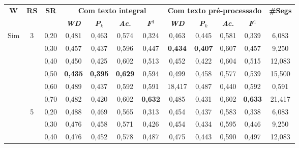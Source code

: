 
\begin{table}[!h]
	\tiny 
	\centering
	\begin{tabular}{|c|c|c||c|c|c|c||c|c|c|c||c|} 
\hline 
\multirow{2}{*}{\textbf{W}} & \multirow{2}{*}{\textbf{RS}} & \multirow{2}{*}{\textbf{SR}} & \multicolumn{4}{c||}{\textbf{Com texto integral}} & \multicolumn{4}{c||}{\textbf{Com texto pré-processado}}& \multirow{2}{*}{\textbf{\#Segs}} \\\cline{4-11}

																									   && & \textit{\textbf{WD}} & \textbf{\textit{P}$_k$} & \textit{\textbf{Ac.}} & \textbf{\textit{F}$^1$} & \textit{\textbf{WD}} & \textbf{\textit{P}$_k$} & \textit{\textbf{Ac.}} & \textbf{\textit{F}$^1$} & \\ \hline 
 \multirow{18}{*}{Sim} & \multirow{6}{*}{3} 
	 & 0,20    & 0,481 & 0,463 & 0,574 & 0,324         &     0,463 &  0,445 & 0,581 & 0,339 & 6,083                \\ \cline{3-12}
	&& 0,30    & 0,457 & 0,437 & 0,596 & 0,447         &     \cellcolor{gray!20} \textbf{0,434} & \cellcolor{gray!20} \textbf{0,407} & 0,607 & 0,457 & 9,250  \\\cline{3-12} 
	&& 0,40    & 0,450 & 0,425 & 0,602 & 0,513         &     0,452 &  0,422 & 0,604 & 0,515 & 12,083              \\ \cline{3-12}                                            
	&& 0,50    & \cellcolor{gray!20} \textbf{0,435} & \cellcolor{gray!20} \textbf{0,395} & \cellcolor{gray!20} \textbf{0,629} & 0,594  &     0,499 &  0,458 & 0,577 & 0,539 & 15,500              \\ \cline{3-12}
	&& 0,60    & 0,489 & 0,437 & 0,592 & 0,591 & 18,417                                &     0,487 &  0,440 & 0,592 & 0,591               \\ \cline{3-12}                 
	&& 0,70    & 0,482 & 0,420 & 0,602 & \cellcolor{gray!20} \textbf{0,632} &    0,485 &  0,431 & 0,602 & \cellcolor{gray!20} \textbf{0,633} & 21,417 \\ \cline{2-12} 
 & \multirow{6}{*}{5} 
	  & 0,20    & 0,488 & 0,469 & 0,565 & 0,313         &     0,454 &  0,437 & 0,583 & 0,338 & 6,083               \\ \cline{3-12}                  
	 && 0,30    & 0,476 & 0,458 & 0,571 & 0,426         &     0,454 &  0,434 & 0,595 & 0,446 & 9,250               \\ \cline{3-12}                  
	 && 0,40    & 0,476 & 0,452 & 0,578 & 0,487         &     0,475 &  0,443 & 0,590 & 0,497 & 12,083              \\ \cline{3-12}                  

\end{tabular}
\end{table}
